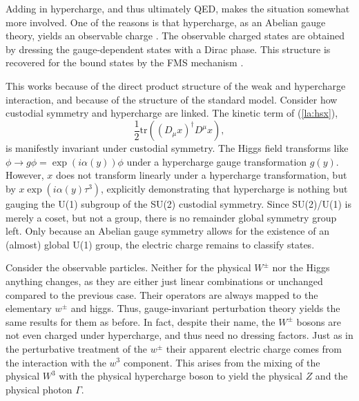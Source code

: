 \documentclass[final,twoside,12pt]{article}
\newcommand*{\no}{\noindent}
\newcommand*{\be}{\begin{equation}}
\newcommand*{\ee}{\end{equation}}
\newcommand*{\pref}[1]{(\ref{#1})}
\newcommand*{\nn}{\nonumber}
\newcommand*{\tr}{\mathrm{tr}}
\newcommand*{\1}{1\!\!\!\bot}
\begin{document}
Adding in hypercharge, and thus ultimately QED, makes the situation somewhat more involved. One of the reasons is that hypercharge, as an Abelian gauge theory, yields an observable charge \cite{Haag:1992hx}. The observable charged states are obtained by dressing the gauge-dependent states with a Dirac phase. This structure is recovered for the bound states by the FMS mechanism \cite{Frohlich:1980gj,Frohlich:1981yi,Shrock:1985ur,Shrock:1986av}.

This works because of the direct product structure of the weak and hypercharge interaction, and because of the structure of the standard model. Consider how custodial symmetry and hypercharge are linked. The kinetic term of \pref{la:hsx},
\be
\frac{1}{2}\tr\left((D_\mu x)^\dagger D^\mu x\right)\nn,
\ee
\no is manifestly invariant under custodial symmetry. The Higgs field transforms like $\phi\to g\phi=\exp(i\alpha(y))\phi$ under a hypercharge gauge transformation $g(y)$. However, $x$ does not transform linearly under a hypercharge transformation, but by $x\exp(i\alpha(y)\tau^3)$, explicitly demonstrating that hypercharge is nothing but gauging the U(1) subgroup of the SU(2) custodial symmetry. Since SU(2)/U(1) is merely a coset, but not a group, there is no remainder global symmetry group left. Only because an Abelian gauge symmetry allows for the existence of an (almost) global U(1) group, the electric charge remains to classify states.

Consider the observable particles. Neither for the physical $W^\pm$ nor the Higgs anything changes, as they are either just linear combinations or unchanged compared to the previous case. Their operators are always mapped to the elementary $w^\pm$ and higgs. Thus, gauge-invariant perturbation theory yields the same results for them as before. In fact, despite their name, the $W^\pm$ bosons are not even charged under hypercharge, and thus need no dressing factors. Just as in the perturbative treatment of the $w^\pm$ \cite{Bohm:2001yx} their apparent electric charge comes from the interaction with the $w^3$ component. This arises from the mixing of the physical $W^3$ with the physical hypercharge boson to yield the physical $Z$ and the physical photon $\Gamma$.
\end{document}
